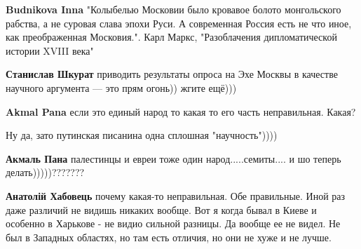 \begin{itemize}
\begin{itemize}
 
\textbf{Budnikova Inna} "Колыбелью Московии было кровавое болото монгольского рабства, а не суровая слава эпохи Руси. А современная Россия есть не что иное, как преображенная Московия.".
Карл Маркс, "Разоблачения дипломатической истории XVIII века"

 
\textbf{Станислав Шкурат} приводить результаты опроса на Эхе Москвы в качестве научного аргумента — это прям огонь)) жгите ещё)))

 
\textbf{Akmal Pana} если это единый народ то какая то его часть неправильная. Какая?

 
Ну да, зато путинская писанина одна сплошная "научность"))))

 
\textbf{Акмаль Пана} палестинцы и евреи тоже один народ.....семиты.... и шо теперь делать)))))???????

 
\textbf{Анатолій Хабовець} почему какая-то неправильная. Обе правильные. Иной раз даже различий не видишь никаких вообще. Вот я когда бывал в Киеве и особенно в Харькове - не видио сильной разницы. Да вообще ее не видел. Не был в Западных областях, но там есть отличия, но они не хуже и не лучше.


\end{itemize}
\end{itemize}
